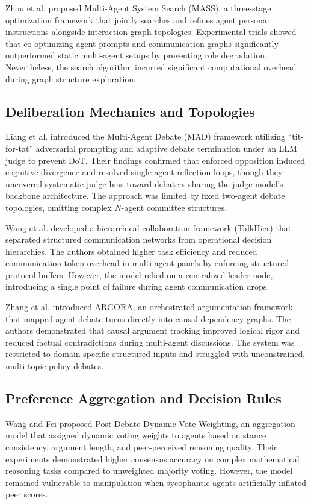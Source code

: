 \documentclass[a4paper,fleqn]{cas-sc}
\begin{document}
Zhou et al. \cite{34} proposed Multi-Agent System Search (MASS), a three-stage optimization framework that jointly searches and refines agent persona instructions alongside interaction graph topologies. Experimental trials showed that co-optimizing agent prompts and communication graphs significantly outperformed static multi-agent setups by preventing role degradation. Nevertheless, the search algorithm incurred significant computational overhead during graph structure exploration.

\subsection{Deliberation Mechanics and Topologies}
Liang et al. \cite{33} introduced the Multi-Agent Debate (MAD) framework utilizing ``tit-for-tat'' adversarial prompting and adaptive debate termination under an LLM judge to prevent DoT. Their findings confirmed that enforced opposition induced cognitive divergence and resolved single-agent reflection loops, though they uncovered systematic judge bias toward debaters sharing the judge model's backbone architecture. The approach was limited by fixed two-agent debate topologies, omitting complex $N$-agent committee structures.

Wang et al. \cite{14} developed a hierarchical collaboration framework (TalkHier) that separated structured communication networks from operational decision hierarchies. The authors obtained higher task efficiency and reduced communication token overhead in multi-agent panels by enforcing structured protocol buffers. However, the model relied on a centralized leader node, introducing a single point of failure during agent communication drops.

Zhang et al. \cite{18} introduced ARGORA, an orchestrated argumentation framework that mapped agent debate turns directly into causal dependency graphs. The authors demonstrated that causal argument tracking improved logical rigor and reduced factual contradictions during multi-agent discussions. The system was restricted to domain-specific structured inputs and struggled with unconstrained, multi-topic policy debates.

\subsection{Preference Aggregation and Decision Rules}
Wang and Fei \cite{7} proposed Post-Debate Dynamic Vote Weighting, an aggregation model that assigned dynamic voting weights to agents based on stance consistency, argument length, and peer-perceived reasoning quality. Their experiments demonstrated higher consensus accuracy on complex mathematical reasoning tasks compared to unweighted majority voting. However, the model remained vulnerable to manipulation when sycophantic agents artificially inflated peer scores.
\end{document}
